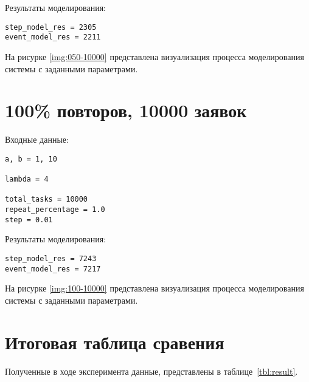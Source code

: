 Результаты моделирования:

\begin{verbatim}
step_model_res = 2305
event_model_res = 2211
\end{verbatim}

На рисурке \ref{img:050-10000} представлена визуализация процесса моделирования системы с заданными параметрами.


\section{100\% повторов, 10000 заявок}

Входные данные:

\begin{verbatim}
a, b = 1, 10

lambda = 4

total_tasks = 10000
repeat_percentage = 1.0
step = 0.01
\end{verbatim}

Результаты моделирования:

\begin{verbatim}
step_model_res = 7243
event_model_res = 7217
\end{verbatim}

На рисурке \ref{img:100-10000} представлена визуализация процесса моделирования системы с заданными параметрами.


\clearpage

\section{Итоговая таблица сравения}

Полученные в ходе эксперимента данные, представлены в таблице~\ref{tbl:result}.

